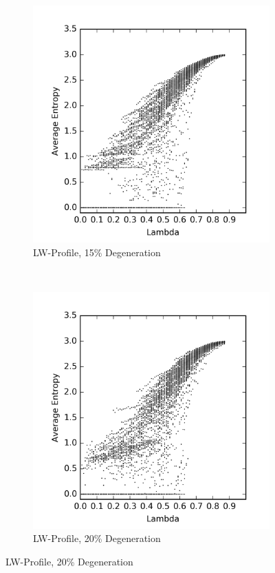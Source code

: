 \documentclass[a4paper,11pt,twoside]{report}
\begin{document}
\begin{figure}[htp]
\begin{subfigure}[t]{0.4\textwidth}
  \centering
  \includegraphics[width=\textwidth]{ch6_figs/degen_stoma_15}
  \caption{LW-Profile, 15\% Degeneration}
  \label{fig:lw_degen_pt_15}
  \end{subfigure}
~
\begin{subfigure}[t]{0.4\textwidth}
  \centering
  \includegraphics[width=\textwidth]{ch6_figs/degen_stoma_20}
  \caption{LW-Profile, 20\% Degeneration}
  \label{fig:lw_degen_pt_20}
  \end{subfigure}


\end{figure}
\end{document}
